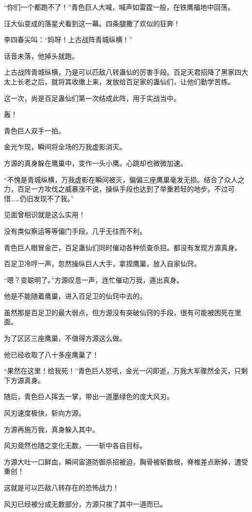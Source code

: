 \begin{this_body}
“你们一个都跑不了！”青色巨人大喊，喊声如雷霆一般，在铁鹰福地中回荡。

汪大仙变成的落星犬看到这一幕。四条腿撒了欢似的狂奔！

李四春尖叫：“妈呀！上古战阵青城纵横！”

话音未落，他掉头就跑。

上古战阵青城纵横，乃是可以匹敌八转蛊仙的厉害手段。百足天君招降了黑家四大太上长老之后，就将其收缴上来，发放给百足家的蛊仙们，让他们勤学苦练。

这一次，尚是百足蛊仙们第一次结成此阵，用于实战当中。

轰！

青色巨人双手一拍。

金光乍现，瞬间将全场的万我虚影消灭。

方源的真身躲在鹰巢中，变作一头小鹰。心跳却也微微加速。

“不愧是青城纵横，万我虚影在瞬间被灭，偏偏三座鹰巢毫发无损。结合了众人之力，百足一方攻伐之威暴涨不说，操纵手段也达到了举重若轻的地步。不过可惜……仍旧发现不了我。”

见面曾相识就是这么实用！

没有类似察运等等偏门手段，几乎无往而不利。

青色巨人眼冒金芒，百足蛊仙们同时催动各种侦查杀招。都没有发现方源真身。

百足卫冷哼一声，忽然操纵巨人大手，拿捏鹰巢，放入自家仙窍。

“嗯？变聪明了。”方源叹息一声，连忙催动万我，遁出真身。

他是不能随着鹰巢，进入百足卫的仙窍中去的。

虽然那是百足卫的最大弱点，但方源没有突破仙窍的手段，很有可能被困死在里面。

为了区区三座鹰巢，不值得方源这么做。

他已经收取了八十多座鹰巢了！

“果然在这里！给我死！”青色巨人怒吼，金光一闪即逝，万我大军骤然全灭，只剩下方源真身。

随后，青色巨人挥去一掌，带出一道墨绿色的庞大风刃。

风刃速度极快，斩向方源。

方源再施万我，真身躲入其中。

风刃竟然也随之变化无数，一一斩中各自目标。

方源大吐一口鲜血，瞬间宙道防御杀招被迫，胸骨被斩数根，脊椎差点断掉，遭受重创！

这就是可以匹敌八转存在的恐怖战力！

风刃已经被分成无数部分，方源只挨了其中一道而已。


\end{this_body}
